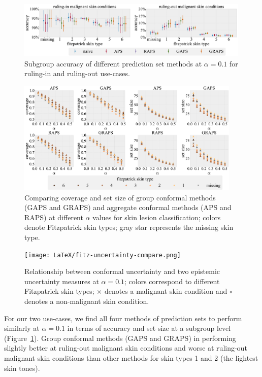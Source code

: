 \documentclass[letterpaper]{article} %
\begin{document}
    \begin{figure}[t]
    \centering
    \includegraphics[width=0.99\textwidth]{LaTeX/fitz-rule-in-out-subgroup.pdf}
    \caption{Subgroup accuracy of different prediction set methods at $\alpha=0.1$ for ruling-in and ruling-out use-cases.}
    \label{fig:fitz-use-case}
    \end{figure}
    
    \begin{figure}[t]
    \centering
    \includegraphics[width=0.95\textwidth]{LaTeX/fitz-subgroup-coverage.pdf} 
    \caption{Comparing coverage and set size of group conformal methods (GAPS and GRAPS) and aggregate conformal methods (APS and RAPS) at different $\alpha$ values for skin lesion classification; colors denote Fitzpatrick skin types; gray star represents the missing skin type.}
    \label{fig:fitz-coverage}
    \end{figure}
    
    \begin{figure}[t]
    \centering
    \texttt{[image: LaTeX/fitz-uncertainty-compare.png]}
    \caption{Relationship between conformal uncertainty and two epistemic uncertainty measures at $\alpha=0.1$; colors correspond to different Fitzpatrick skin types; $\times$ denotes a malignant skin condition and $\circ$ denotes a non-malignant skin condition.}
    \label{fig:epistemic-uncertainty}
    \end{figure}
    
    For our two use-cases, we find all four methods of prediction sets to perform similarly at $\alpha=0.1$ in terms of accuracy and set size at a subgroup level (Figure~\ref{fig:fitz-use-case}). 
    Group conformal methods (GAPS and GRAPS) in performing slightly better at ruling-out malignant skin conditions and worse at ruling-out malignant skin conditions than other methods for skin types 1 and 2 (the lightest skin tones).
    
\end{document}
